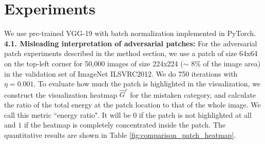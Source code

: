 \documentclass[10pt,twocolumn,letterpaper]{article}
\begin{document}





\section{Experiments}
 We use pre-trained VGG-19 \cite{simonyan2014very} with batch normalization implemented in PyTorch.\\



{\bf 4.1. Misleading interpretation of adversarial patches:}
\label{exp_misleading_adv_patches}
For the adversarial patch experiments described in the method section, we use a patch of size 64x64 on the top-left corner for 50,000 images of size 224x224 ($\sim$ 8\% of the image area) in the validation set of ImageNet \cite{deng2009imagenet} ILSVRC2012. We do 750 iterations with $\eta = 0.001$. To evaluate how much the patch is highlighted in the visualization, we construct the visualization heatmap $\hat{G}^c$ for the mistaken category, and calculate the ratio of the total energy at the patch location to that of the whole image. We call this metric ``energy ratio". It will be $0$ if the patch is not highlighted at all and $1$ if the heatmap is completely concentrated inside the patch. The quantitative results are shown in Table \ref{fig:comparison_patch_heatmap}.

\end{document}
